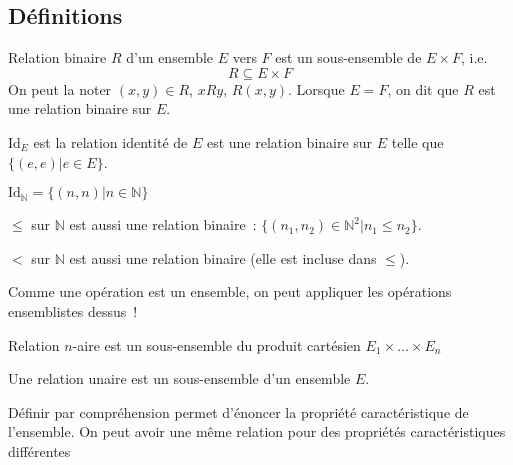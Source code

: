 \documentclass[a4paper, titlepage]{article}
\begin{document}
    \subsection{Définitions}
    \begin{defn}
        Relation binaire $R$ d'un ensemble $E$ vers $F$ est un sous-ensemble de $E\times F$, i.e.
        $$ R\subseteq E\times F $$
        On peut la noter $(x,y)\in R$, $x R y$, $R(x,y)$.
        Lorsque $E=F$, on dit que $R$ est une relation binaire sur $E$.
    \end{defn}
    \begin{exemple}
        $\mathrm{Id}_E$ est la relation identité de $E$ est une relation binaire sur $E$ telle que $\{(e,e)|e\in E\}$.

        $\mathrm{Id}_{\mathbb{N}} = \{(n,n)|n\in\mathbb{N}\}$

        $\leqslant$ sur $\mathbb{N}$ est aussi une relation binaire~: $\{(n_1,n_2)\in\mathbb{N}^2|n_1\leqslant n_2\}$.

        $<$ sur $\mathbb{N}$ est aussi une relation binaire (elle est incluse dans $\leqslant$).
    \end{exemple}
    Comme une opération est un ensemble, on peut appliquer les opérations ensemblistes dessus~!
    \begin{defn}
        Relation $n$-aire est un sous-ensemble du produit cartésien $E_1\times\ldots\times E_n$
    \end{defn}
    \begin{defn}
        Une relation unaire est un sous-ensemble d'un ensemble $E$.
    \end{defn}
    Définir par compréhension permet d'énoncer la propriété caractéristique de l'ensemble. 
    On peut avoir une même relation pour des propriétés caractéristiques différentes
\end{document}
